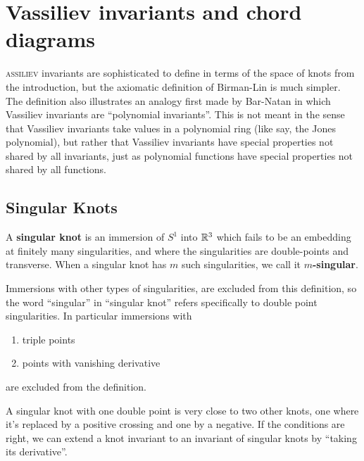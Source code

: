 \chapter{Vassiliev invariants and chord diagrams}
\label{ch:vassiliev-invariants-and-chord-diagrams}

\lettrine{}{assiliev} invariants are sophisticated to define in terms of the space of knots from the introduction, but the axiomatic definition of Birman-Lin \cite{knot-polynomials-and-vassilievs-invariants} is much simpler. The definition also illustrates an analogy first made by Bar-Natan \cite{on-the-vassiliev-knot-invariants} in which Vassiliev invariants are ``polynomial invariants''. This is not meant in the sense that Vassiliev invariants take values in a polynomial ring (like say, the Jones polynomial), but rather that Vassiliev invariants have special properties not shared by all invariants, just as polynomial functions have special properties not shared by all functions.

\section{Singular Knots}
\label{sec:singular-knots}

\begin{definition}
	A \textbf{singular knot} is an immersion of \(S^{1}\) into \(\mathbb{R}^{3}\) which fails to be an embedding at finitely many singularities, and where the singularities are double-points and transverse. When a singular knot has \(m\) such singularities, we call it \textbf{\(m\)-singular}.
\end{definition}

\begin{remark}
	\label{rem:other-singularities}
	Immersions with other types of singularities, are excluded from this definition, so the word ``singular'' in ``singular knot'' refers specifically to double point singularities. In particular immersions with
	\begin{enumerate}
		\item triple points
		\item points with vanishing derivative
	\end{enumerate}
	are excluded from the definition.
\end{remark}

A singular knot with one double point is very close to two other knots, one where it's replaced by a positive crossing and one by a negative. If the conditions are right, we can extend a knot invariant to an invariant of singular knots by ``taking its derivative''.

